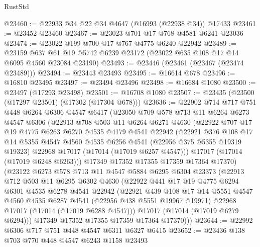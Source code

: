 \begin{lexlean}{RustStd}
\begin{coremodule}
@23460 := @22933 @34 @22 @34 @4647 (@16993 (@22938 @34)) @17433
@23461 := @23452 @23460
@23467 := @23023 @701 @17 @768 @4581 @6241 @23036
@23474 := @23022 @199 @700 @17 @767 @4775 @6240 @22942
@23489 := @23159
    @637
    @61
    @19
    @5742
    @6239
    @23172
    (@23022 @635 @108 @17 @14 @6095 @4560 @23084 @23190)
@23493 := @23446 (@23461 (@23467 (@23474 @23489)))
@23494 := @23443 @23493
@23495 := @16614 @678
@23496 := @16810 @23495
@23497 := @23494 @23496
@23498 := @16684 @1080
@23500 := @23497 (@17293 @23498)
@23501 := @16708 @1080
@23507 := @23435 (@23500 (@17297 @23501) (@17302 (@17304 @678)))
@23636 := @22902
    @714
    @717
    @751
    @448
    @6264
    @6306
    @4547
    @6417
    (@23050
      @709
      @578
      @713
      @11
      @6264
      @6273
      @4547
      @6306
      (@22913
        @708
        @503
        @11
        @6264
        @6271
        @4630
        (@22922
          @707
          @17
          @19
          @4775
          @6263
          @6270
          @4535
          @4179
          @4541
          @22942
          (@22921
            @376
            @108
            @17
            @14
            @5355
            @4547
            @4560
            @4535
            @6256
            @4541
            (@22956 @375 @5355 @19319 @19323)
            @22968
            @17017
            (@17014 (@17019 @6257 @4547)))
          @17017
          (@17014 (@17019 @6248 @6263)))
        @17349
        @17352
        @17355
        @17359
        @17364
        @17370)
      (@23122
        @6273
        @578
        @713
        @11
        @4547
        @5884
        @6295
        @6304
        @23373
        (@22913
          @712
          @503
          @11
          @6295
          @6302
          @4630
          (@22922
            @441
            @17
            @19
            @4775
            @6294
            @6301
            @4535
            @6278
            @4541
            @22942
            (@22921
              @439
              @108
              @17
              @14
              @5551
              @4547
              @4560
              @4535
              @6287
              @4541
              (@22956 @438 @5551 @19967 @19971)
              @22968
              @17017
              (@17014 (@17019 @6288 @4547)))
            @17017
            (@17014 (@17019 @6279 @6294)))
          @17349
          @17352
          @17355
          @17359
          @17364
          @17370)))
@23644 := @22992 @6306 @717 @751 @448 @4547 @6311 @6327 @6415
@23652 := @23436 @138 @703 @770 @448 @4547 @6243 @1158 @23493

\end{coremodule}
\end{lexlean}
